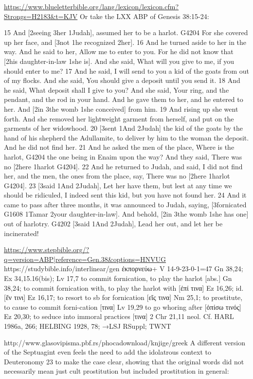 \documentclass[11pt]{article}
\begin{document}
\url{https://www.blueletterbible.org/lang/lexicon/lexicon.cfm?Strongs=H2183&t=KJV}
Or take the LXX ABP of Genesis 38:15-24:

15 And [2seeing 3her 1Judah], assumed her to be a harlot. G4204 For she covered up her face, and [3not 1he recognized 2her]. 16 And he turned aside to her in the way. And he said to her, Allow me to enter to you. For he did not know that [2his daughter-in-law 1she is]. And she said, What will you give to me, if you should enter to me? 17 And he said, I will send to you a kid of the goats from out of my flocks. And she said, You should give a deposit until you send it. 18 And he said, What deposit shall I give to you? And she said, Your ring, and the pendant, and the rod in your hand. And he gave them to her, and he entered to her. And [2in 3the womb 1she conceived] from him. 19 And rising up she went forth. And she removed her lightweight garment from herself, and put on the garments of her widowhood. 20 [3sent 1And 2Judah] the kid of the goats by the hand of his shepherd the Adullamite, to deliver by him to the woman the deposit. And he did not find her. 21 And he asked the men of the place, Where is the harlot, G4204 the one being in Enaim upon the way? And they said, There was no [2here 1harlot G4204]. 22 And he returned to Judah, and said, I did not find her, and the men, the ones from the place, say, There was no [2here 1harlot G4204]. 23 [3said 1And 2Judah], Let her have them, but lest at any time we should be ridiculed, I indeed sent this kid, but you have not found her. 24 And it came to pass after three months, it was announced to Judah, saying, [3fornicated G1608 1Tamar 2your daughter-in-law]. And behold, [2in 3the womb 1she has one] out of harlotry. G4202 [3said 1And 2Judah], Lead her out, and let her be incinerated!

\url{https://www.stepbible.org/?q=version=ABP|reference=Gen.38&options=HNVUG}
https://studybible.info/interlinear/gen%
ἐκπορνεύω+
V 14-9-23-0-1=47
Gn 38,24; Ex 34,15.16(bis); Lv 17,7
to commit fornication, to play the harlot [abs.] Gn 38,24; to commit fornication with, to play the harlot
with [ἐπί τινα] Ez 16,26; id. [ἔν τινι] Ez 16,17; to resort to sb for fornication [εἴς τινα] Nm 25,1; to
prostitute, to cause to commit forni-cation [τινα] Lv 19,29
to go whoring after [ὀπίσω τινός] Ez 20,30; to seduce into immoral practices [τινα] 2 Chr 21,11
neol.
Cf. HARL 1986a, 266; HELBING 1928, 78; →LSJ RSuppl; TWNT

http://www.glasovipisma.pbf.rs/phocadownload/knjige/greek%
A different version of the Septuagint even feels the need to add the idolatrous context to Deuteronomy 23 to make the case clear, showing that the original words did not necessarily mean just cult prostitution but included prostitution in general:
\end{document}
